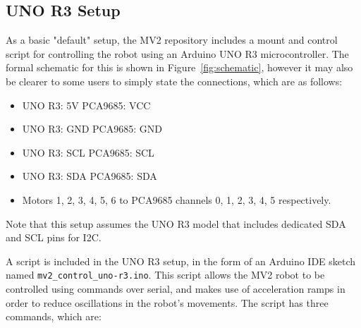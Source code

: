\documentclass[a4paper,11pt]{article}
\begin{document}
\subsection{UNO R3 Setup}
As a basic "default" setup, the MV2 repository includes a mount and control script for controlling the robot using an Arduino UNO R3 microcontroller. The formal schematic for this is shown in Figure~\ref{fig:schematic}, however it may also be clearer to some users to simply state the connections, which are as follows:
\begin{itemize}
    \item UNO R3: 5V \rightarrow PCA9685: VCC
    \item UNO R3: GND \rightarrow PCA9685: GND
    \item UNO R3: SCL \rightarrow PCA9685: SCL
    \item UNO R3: SDA \rightarrow PCA9685: SDA
    \item Motors 1, 2, 3, 4, 5, 6 to PCA9685 channels 0, 1, 2, 3, 4, 5 respectively.
\end{itemize}

Note that this setup assumes the UNO R3 model that includes dedicated SDA and SCL pins for I2C.

A script is included in the UNO R3 setup, in the form of an Arduino IDE sketch named \texttt{mv2\_control\_uno-r3.ino}. This script allows the MV2 robot to be controlled using commands over serial, and makes use of acceleration ramps in order to reduce oscillations in the robot's movements. The script has three commands, which are:
\end{document}

